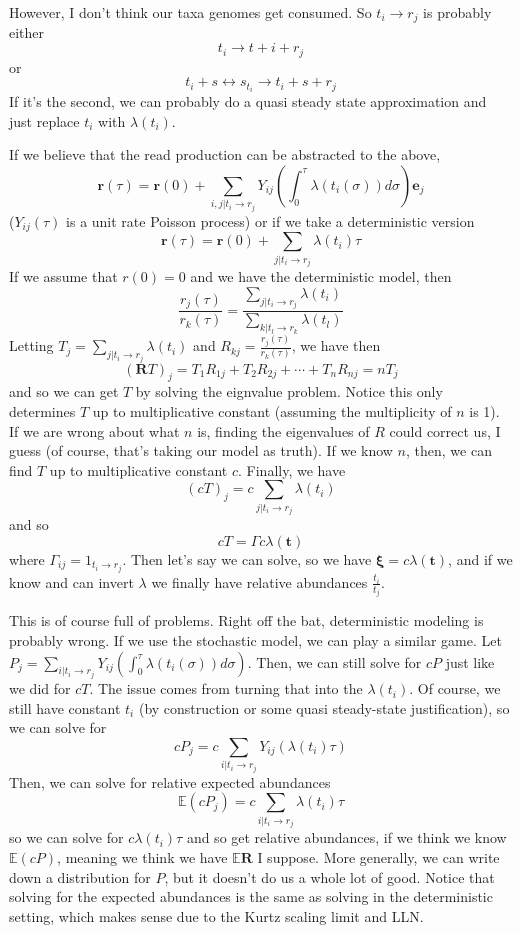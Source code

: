 \documentclass[10pt]{article}
\theoremstyle{definition}
\numberwithin{theorem}{section}
\numberwithin{definition}{section}
\numberwithin{lemma}{section}
\numberwithin{corollary}{section}
\numberwithin{clm}{section}
\numberwithin{rmk}{section}
\renewcommand{\b}{\bm}
\newcommand{\bE}{\mathbb{E}}
\begin{document}
However, I don't think our taxa genomes get consumed. So $t_i \rightarrow r_j$ is probably either
\[
t_i \rightarrow t+i + r_j
\]
or 
\[
t_i + s \leftrightarrow s_{t_i} \rightarrow t_i + s + r_j
\]
If it's the second, we can probably do a quasi steady state approximation and just replace $t_i$ with $\lambda(t_i)$. 

If we believe that the read production can be abstracted to the above,
\[
\b{r}(\tau) = \b{r}(0) + \sum_{i,j|t_i\rightarrow r_j} Y_{ij}\left(\int_0^{\tau} \lambda(t_i(\sigma))d\sigma\right)\b{e}_j
\]
($Y_{ij}(\tau)$ is a unit rate Poisson process) or if we take a deterministic version
\[
\b{r}(\tau) = \b{r}(0) + \sum_{j|t_i\rightarrow r_j} \lambda(t_i)\tau
\]
If we assume that $r(0) = 0$ and we have the deterministic model, then
\[
\frac{r_j(\tau)}{r_k(\tau)} = \frac{\sum_{j|t_i\rightarrow r_j} \lambda(t_i)}{\sum_{k|t_l\rightarrow r_k} \lambda(t_l)}
\]
Letting $T_j = \sum_{j|t_i\rightarrow r_j} \lambda(t_i)$ and $R_{kj} = \frac{r_j(\tau)}{r_k(\tau)}$, we have then
\[
(\b{R}T)_j  = T_{1}R_{1j} + T_2R_{2j} + \cdots + T_nR_{nj} = nT_j
\]
and so we can get $T$ by solving the eignvalue problem. Notice this only determines $T$ up to multiplicative constant (assuming the multiplicity of $n$ is 1). If we are wrong about what $n$ is, finding the eigenvalues of $R$ could correct us, I guess (of course, that's taking our model as truth). If we know $n$, then, we can find $T$ up to multiplicative constant $c$. Finally, we have
\[
(cT)_j = c\sum_{j|t_i\rightarrow r_j} \lambda(t_i)
\]
and so
\[
cT = \Gamma c\lambda(\b{t})
\]
where $\Gamma_{ij} = 1_{t_i \rightarrow r_j}$. Then let's say we can solve, so we have $\b{\xi} = c\lambda(\b{t})$, and if we know and can invert $\lambda$ we finally have relative abundances $\frac{t_i}{t_j}$. 

This is of course full of problems. Right off the bat, deterministic modeling is probably wrong. If we use the stochastic model, we can play a similar game. Let $P_j = \sum_{i|t_i\rightarrow r_j} Y_{ij}\left(\int_0^{\tau} \lambda(t_i(\sigma))d\sigma\right)$. Then, we can still solve for $cP$ just like we did for $cT$. The issue comes from turning that into the $\lambda(t_i)$. Of course, we still have constant $t_i$ (by construction or some quasi steady-state justification), so we can solve for
\[
cP_j = c\sum_{i|t_i\rightarrow r_j} Y_{ij}\left(\lambda(t_i)\tau\right)
\]
Then, we can solve for relative expected abundances
\[
\bE(cP_j)  = c\sum_{i|t_i \rightarrow r_j} \lambda(t_i)\tau
\]
so we can solve for $c\lambda(t_i)\tau$ and so get relative abundances, if we think we know $\bE(cP)$, meaning we think we have $\bE \b{R}$ I suppose. More generally, we can write down a distribution for $P$, but it doesn't do us a whole lot of good. Notice that solving for the expected abundances is the same as solving in the deterministic setting, which makes sense due to the Kurtz scaling limit and LLN. 
\end{document}
